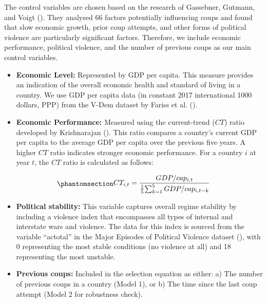 \documentclass[
  12pt,
]{report}
\providecommand{\tightlist}{%
  \setlength{\itemsep}{0pt}\setlength{\parskip}{0pt}}\usepackage{longtable,booktabs,array}
\begin{document}
The control variables are chosen based on the research of Gassebner,
Gutmann, and Voigt (). They analysed
66 factors potentially influencing coups and found that slow economic
growth, prior coup attempts, and other forms of political violence are
particularly significant factors. Therefore, we include economic
performance, political violence, and the number of previous coups as our
main control variables.

\begin{itemize}
\tightlist
\item
  \textbf{Economic Level:} Represented by GDP per capita. This measure
  provides an indication of the overall economic health and standard of
  living in a country. We use GDP per capita data (in constant 2017
  international 1000 dollars, PPP) from the V-Dem dataset by Fariss et
  al. ().
\item
  \textbf{Economic Performance:} Measured using the current-trend
  (\(CT\)) ratio developed by Krishnarajan
  (). This ratio compares a
  country's current GDP per capita to the average GDP per capita over
  the previous five years. A higher \(CT\) ratio indicates stronger
  economic performance. For a country \(i\) at year \(t\), the \(CT\)
  ratio is calculated as follows:
\end{itemize}

\begin{equation}\phantomsection\label{eq-eq6}{
    \begin{aligned}
    CT_{i,t} = {GDP/cap_{i,t} \over {1 \over 5} {\sum_{k=1}^5GDP/cap_{i,t-k}}}
    \end{aligned}
}\end{equation}

\begin{itemize}
\tightlist
\item
  \textbf{Political stability:} This variable captures overall regime
  stability by including a violence index that encompasses all types of
  internal and interstate wars and violence. The data for this index is
  sourced from the variable ``actotal'' in the Major Episodes of
  Political Violence dataset
  (), with 0
  representing the most stable conditions (no violence at all) and 18
  representing the most unstable.
\item
  \textbf{Previous coups:} Included in the selection equation as either:
  a) The number of previous coups in a country (Model 1), or b) The time
  since the last coup attempt (Model 2 for robustness check).
\end{itemize}
\end{document}
